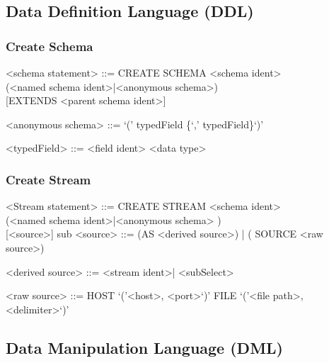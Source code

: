 \subsection{Data Definition Language (DDL)}
\subsubsection{Create Schema}

\setlength{\grammarindent}{12em} %

\begin{grammar}

<schema statement> ::= CREATE SCHEMA <schema ident> \\
(<named schema ident>|<anonymous schema>) \\
  { }[EXTENDS <parent schema ident>]

<anonymous schema> ::= `(' typedField \{`,' typedField\}`)'

<typedField> ::= <field ident> <data type>

\end{grammar}
	
	




\subsubsection{Create Stream}
	
					
\begin{grammar}
<Stream statement> ::= CREATE STREAM <schema ident> \\		(<named schema ident>|<anonymous schema> ) \\
{ }[<source>]
sub
<source> ::= (AS <derived source>) | ( SOURCE <raw source>)

<derived source> ::=  <stream ident>| <subSelect>

<raw source> ::= 
				HOST `('<host>, <port>`)'
					\alt FILE `('<file path>, <delimiter>`)'
\end{grammar}


\subsection{Data Manipulation Language (DML)}

